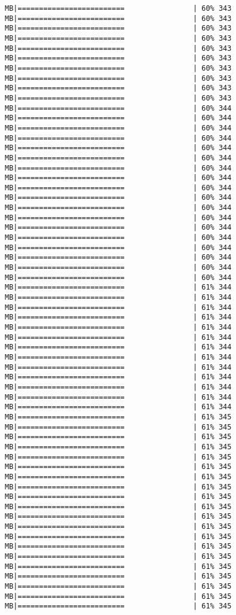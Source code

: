 \documentclass[
]{article}
\begin{document}
\begin{verbatim}
MB|=========================                | 60% 343 MB|=========================                | 60% 343 MB|=========================                | 60% 343 MB|=========================                | 60% 343 MB|=========================                | 60% 343 MB|=========================                | 60% 343 MB|=========================                | 60% 343 MB|=========================                | 60% 343 MB|=========================                | 60% 343 MB|=========================                | 60% 343 MB|=========================                | 60% 344 MB|=========================                | 60% 344 MB|=========================                | 60% 344 MB|=========================                | 60% 344 MB|=========================                | 60% 344 MB|=========================                | 60% 344 MB|=========================                | 60% 344 MB|=========================                | 60% 344 MB|=========================                | 60% 344 MB|=========================                | 60% 344 MB|=========================                | 60% 344 MB|=========================                | 60% 344 MB|=========================                | 60% 344 MB|=========================                | 60% 344 MB|=========================                | 60% 344 MB|=========================                | 60% 344 MB|=========================                | 60% 344 MB|=========================                | 60% 344 MB|=========================                | 61% 344 MB|=========================                | 61% 344 MB|=========================                | 61% 344 MB|=========================                | 61% 344 MB|=========================                | 61% 344 MB|=========================                | 61% 344 MB|=========================                | 61% 344 MB|=========================                | 61% 344 MB|=========================                | 61% 344 MB|=========================                | 61% 344 MB|=========================                | 61% 344 MB|=========================                | 61% 344 MB|=========================                | 61% 344 MB|=========================                | 61% 345 MB|=========================                | 61% 345 MB|=========================                | 61% 345 MB|=========================                | 61% 345 MB|=========================                | 61% 345 MB|=========================                | 61% 345 MB|=========================                | 61% 345 MB|=========================                | 61% 345 MB|=========================                | 61% 345 MB|=========================                | 61% 345 MB|=========================                | 61% 345 MB|=========================                | 61% 345 MB|=========================                | 61% 345 MB|=========================                | 61% 345 MB|=========================                | 61% 345 MB|=========================                | 61% 345 MB|=========================                | 61% 345 MB|=========================                | 61% 345 MB|=========================                | 61% 345 MB|=========================                | 61% 345 
\end{verbatim}
\end{document}
